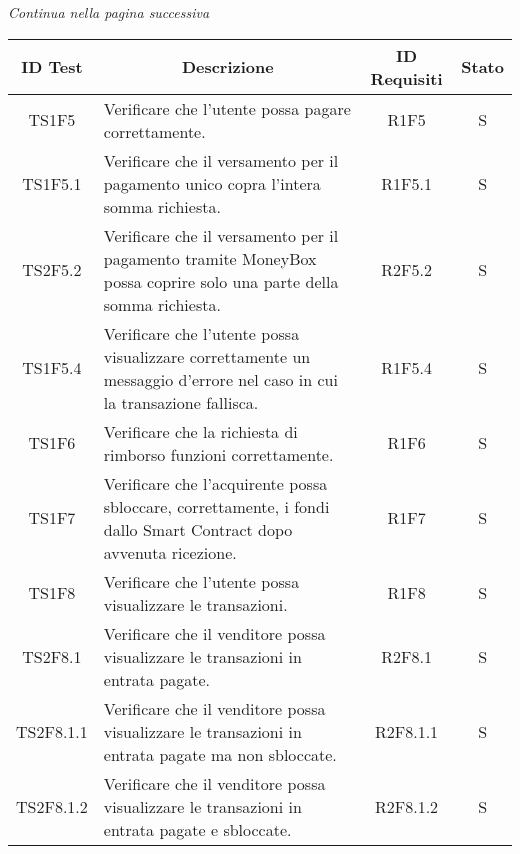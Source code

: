 \begin{center}
  \textit{\small Continua nella pagina successiva}
\end{center}
\begin{table}[H]
  \centering
  \renewcommand{\arraystretch}{1.8}
  \begin{tabular}{c|p{8cm}|c|c}
    \rowcolor[HTML]{125E28}
    \color[HTML]{FFFFFF}\textbf{ID Test}
              & \multicolumn{1}{c}{\color[HTML]{FFFFFF}\textbf{Descrizione}}
              & \color[HTML]{FFFFFF}\textbf{ID Requisiti}
              & \color[HTML]{FFFFFF}\textbf{Stato}                                                                                                      \\
    \hline
    TS1F5     & Verificare che l'utente possa pagare correttamente.                                                                      & R1F5     & S \\
    TS1F5.1   & Verificare che il versamento per il pagamento unico copra l'intera somma richiesta.                                      & R1F5.1   & S \\
    TS2F5.2   & Verificare che il versamento per il pagamento tramite MoneyBox\glo{} possa coprire solo una parte della somma richiesta. & R2F5.2   & S \\
    TS1F5.4   & Verificare che l'utente possa visualizzare correttamente un messaggio d'errore nel caso in cui la transazione fallisca.  & R1F5.4   & S \\
    TS1F6     & Verificare che la richiesta di rimborso funzioni correttamente.                                                          & R1F6     & S \\
    TS1F7     & Verificare che l'acquirente possa sbloccare, correttamente, i fondi dallo Smart Contract\glo{} dopo avvenuta ricezione.  & R1F7     & S \\
    TS1F8     & Verificare che l'utente possa visualizzare le transazioni.                                                               & R1F8     & S \\
    TS2F8.1   & Verificare che il venditore possa visualizzare le transazioni in entrata pagate.                                         & R2F8.1   & S \\
    TS2F8.1.1 & Verificare che il venditore possa visualizzare le transazioni in entrata pagate ma non sbloccate.                        & R2F8.1.1 & S \\
    TS2F8.1.2 & Verificare che il venditore possa visualizzare le transazioni in entrata pagate e sbloccate.                             & R2F8.1.2 & S \\

\end{tabular}
\end{table}

